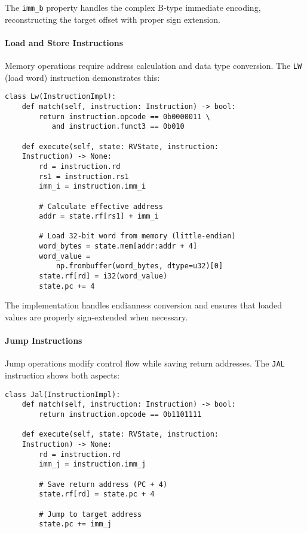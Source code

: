 \documentclass[sigconf]{acmart}
\begin{document}
The \texttt{imm\_b} property handles the complex B-type immediate encoding, reconstructing the target offset with proper sign extension.

\paragraph{Load and Store Instructions}
Memory operations require address calculation and data type conversion. The \texttt{LW} (load word) instruction demonstrates this:

\begin{verbatim}
class Lw(InstructionImpl):
    def match(self, instruction: Instruction) -> bool:
        return instruction.opcode == 0b0000011 \
           and instruction.funct3 == 0b010
    
    def execute(self, state: RVState, instruction: 
    Instruction) -> None:
        rd = instruction.rd
        rs1 = instruction.rs1
        imm_i = instruction.imm_i
        
        # Calculate effective address
        addr = state.rf[rs1] + imm_i
        
        # Load 32-bit word from memory (little-endian)
        word_bytes = state.mem[addr:addr + 4]
        word_value = 
            np.frombuffer(word_bytes, dtype=u32)[0]
        state.rf[rd] = i32(word_value)
        state.pc += 4
\end{verbatim}

The implementation handles endianness conversion and ensures that loaded values are properly sign-extended when necessary.

\paragraph{Jump Instructions}
Jump operations modify control flow while saving return addresses. The \texttt{JAL} instruction shows both aspects:

\begin{verbatim}
class Jal(InstructionImpl):
    def match(self, instruction: Instruction) -> bool:
        return instruction.opcode == 0b1101111
    
    def execute(self, state: RVState, instruction: 
    Instruction) -> None:
        rd = instruction.rd
        imm_j = instruction.imm_j
        
        # Save return address (PC + 4)
        state.rf[rd] = state.pc + 4
        
        # Jump to target address
        state.pc += imm_j
\end{verbatim}
\end{document}
